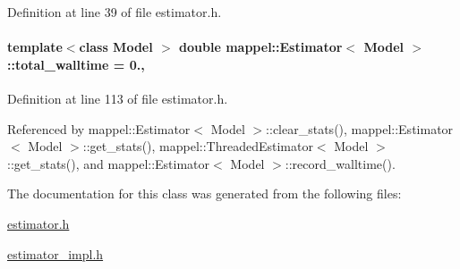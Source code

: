 Definition at line 39 of file estimator.\+h.

\paragraph[{\texorpdfstring{total\+\_\+walltime}{total_walltime}}]{\setlength{\rightskip}{0pt plus 5cm}template$<$class Model $>$ double {\bf mappel\+::\+Estimator}$<$ Model $>$\+::total\+\_\+walltime = 0.\hspace{0.3cm}{\ttfamily [protected]}, {\ttfamily [inherited]}}\hypertarget{classmappel_1_1Estimator_a5a408458a111c5222193871fa6bb6644}{}\label{classmappel_1_1Estimator_a5a408458a111c5222193871fa6bb6644}


Definition at line 113 of file estimator.\+h.



Referenced by mappel\+::\+Estimator$<$ Model $>$\+::clear\+\_\+stats(), mappel\+::\+Estimator$<$ Model $>$\+::get\+\_\+stats(), mappel\+::\+Threaded\+Estimator$<$ Model $>$\+::get\+\_\+stats(), and mappel\+::\+Estimator$<$ Model $>$\+::record\+\_\+walltime().



The documentation for this class was generated from the following files\+:\begin{DoxyCompactItemize}
\item 
\hyperlink{estimator_8h}{estimator.\+h}\item 
\hyperlink{estimator__impl_8h}{estimator\+\_\+impl.\+h}\end{DoxyCompactItemize}
